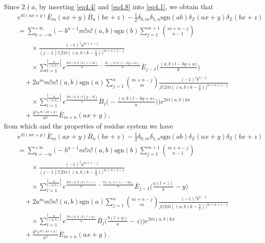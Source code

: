 \documentclass[reqno]{amsart}
\numberwithin{equation}{section}
\begin{document}
Since $2\nmid a$, by inserting \eqref{eq4.4} and \eqref{eq4.8} into \eqref{eq4.1}, we obtain that
\begin{eqnarray*}
&&e^{\pi\mathrm{i}(ax+y)}\overline{E}_{m}(ax+y)\overline{B}_{n}(bx+z)-\frac{1}{2}\delta_{0,m}\delta_{1,n}\mathrm{sgn}(ab)\delta_{\mathbb{Z}}(ax+y)\delta_{\mathbb{Z}}(bx+z)\nonumber\\
&&=\sum_{k=-\infty}^{+\infty}\biggl(-b^{n-1}m!n!(a,b)\mathrm{sgn}(b)\sum_{j=1}^{m+1}
\binom{m+n-j}{n-1}\nonumber\\
&&\qquad\times\frac{(-1)^{j}a^{m+1-j}}{(j-1)!\bigl(2\pi\mathrm{i}((a,b)k-\frac{a}{2})\bigl)^{m+n+1-j}}\nonumber\\
&&\qquad\times\sum_{l=1}^{|\frac{b}{(a,b)}|}e^{\frac{2\pi\mathrm{i}(a,b)k(z+\overline{a}l)}{b}-\frac{\pi\mathrm{i}((a,b)l-by+az)}{b}}
\overline{E}_{j-1}\biggl(\frac{(a,b)l-by+az}{b}\biggl)\nonumber\\
&&\quad+2a^{m}m!n!(a,b)\mathrm{sgn}(a)\sum_{j=1}^{n}\binom{m+n-j}{m}\frac{(-1)^{j}b^{n-j}}{j!\bigl(2\pi\mathrm{i}((a,b)k-\frac{a}{2})\bigl)^{m+n+1-j}}\nonumber\\
&&\qquad\times\sum_{l=1}^{|\frac{a}{(a,b)}|}e^{\frac{2\pi\mathrm{i}(a,b)k(y-\overline{b}l)}{a}}
\overline{B}_{j}\biggl(-\frac{(a,b)l-by+az}{a}\biggl)\biggl)e^{2\pi\mathrm{i}(a,b)kx}\nonumber\\
&&\quad+\frac{b^{n}e^{\pi\mathrm{i}(ax+y)}}{a^{n}}\overline{E}_{m+n}(ax+y),
\end{eqnarray*}
from which and the properties of residue system we have
\begin{eqnarray*}
&&e^{\pi\mathrm{i}(ax+y)}\overline{E}_{m}(ax+y)\overline{B}_{n}(bx+z)-\frac{1}{2}\delta_{0,m}\delta_{1,n}\mathrm{sgn}(ab)\delta_{\mathbb{Z}}(ax+y)\delta_{\mathbb{Z}}(bx+z)\nonumber\\
&&=\sum_{k=-\infty}^{+\infty}\biggl(-b^{n-1}m!n!(a,b)\mathrm{sgn}(b)\sum_{j=1}^{m+1}
\binom{m+n-j}{n-1}\nonumber\\
&&\qquad\times\frac{(-1)^{j}a^{m+1-j}}{(j-1)!\bigl(2\pi\mathrm{i}((a,b)k-\frac{a}{2})\bigl)^{m+n+1-j}}\nonumber\\
&&\qquad\times\sum_{l=1}^{|\frac{b}{(a,b)}|}e^{\frac{2\pi\mathrm{i}(a,b)k(l+z)}{b}-\frac{\pi\mathrm{i}(a(l+z)-by)}{b}}
\overline{E}_{j-1}\biggl(\frac{a(l+z)}{b}-y\biggl)\nonumber\\
&&\quad+2a^{m}m!n!(a,b)\mathrm{sgn}(a)\sum_{j=1}^{n}\binom{m+n-j}{m}\frac{(-1)^{j}b^{n-j}}{j!\bigl(2\pi\mathrm{i}((a,b)k-\frac{a}{2})\bigl)^{m+n+1-j}}\nonumber\\
&&\qquad\times\sum_{l=1}^{|\frac{a}{(a,b)}|}e^{\frac{2\pi\mathrm{i}(a,b)k(l+y)}{a}}
\overline{B}_{j}\biggl(\frac{b(l+y)}{a}-z\biggl)\biggl)e^{2\pi\mathrm{i}(a,b)kx}\nonumber\\
&&\quad+\frac{b^{n}e^{\pi\mathrm{i}(ax+y)}}{a^{n}}\overline{E}_{m+n}(ax+y).
\end{eqnarray*}
\end{document}
